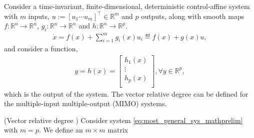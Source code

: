 {{\myblue Consider a time-invariant, finite-dimensional, deterministic control-affine system with $m$ inputs, $u:=[u_1 \cdots u_m]^{\top}\in \mathbb{R}^m$ and $p$ outputs, along with smooth maps $f:\mathbb{R}^n\rightarrow \mathbb{R}^n$, $g_{i}:\mathbb{R}^n\rightarrow \mathbb{R}^n$ and $h:\mathbb{R}^n\rightarrow \mathbb{R}^p$.
%
\begin{eqnarray}\label{eq:most_general_sys_mathprelim}
 \dot{x}=f(x)+ \sum^{m}_{i=1}g_{i}(x)u_{i} \eqdef f(x)+ g(x)u,
\end{eqnarray}
and consider a function,
\begin{eqnarray}\label{eq:most_general_output_appendex}
  y=h(x)=\left[
  \begin{array}{c}
      h_1 (x)\\
      \vdots\\
      h_p (x)\\
  \end{array} \right],\forall y \in \mathbb{R}^p,
\end{eqnarray}
which is the output of the system. 
The vector relative degree can be defined for the multiple-input multiple-output (MIMO) systems.

\begin{definition}(Vector relative degree \cite{Sastry})
\label{def:vector_relative_deg}
Consider system \eqref{eq:most_general_sys_mathprelim} with $m=p$. We define an $m \times m$ matrix


\end{definition}}}
